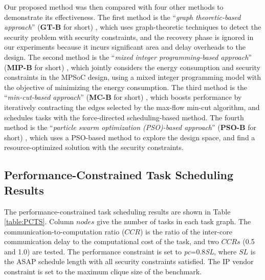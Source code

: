 \documentclass[10pt,journal, compsoc]{IEEEtran}
\begin{document}
Our proposed method was then compared with four other methods to demonstrate its effectiveness. The first method is the ``\textit{graph theoretic-based approach}'' (\textbf{GT-B} for short) \cite{article:XC}, which uses graph-theoretic techniques to detect the security problem with security constraints, and the recovery phase is ignored in our experiments because it incurs significant area and delay overheads to the design. The second method is the ``\textit{mixed integer programming-based approach}'' (\textbf{MIP-B} for short) \cite{article:YS}, which jointly considers the energy consumption and security constraints in the MPSoC design, using a mixed integer programming model with the objective of minimizing the energy consumption. The third method is the ``\textit{min-cut-based approach}'' (\textbf{MC-B} for short) \cite{article:NW}, which boosts performance by iteratively contracting the edges selected by the max-flow min-cut algorithm, and schedules tasks with the force-directed scheduling-based method. The fourth method is the ``\textit{particle swarm optimization (PSO)-based approach}'' (\textbf{PSO-B} for short) \cite{article:SR}, which uses a PSO-based method to explore the design space, and find a resource-optimized solution with the security constraints.





\subsection{Performance-Constrained Task Scheduling Results}


The performance-constrained task scheduling results are shown in Table \ref{table:PCTS}. Column $nodes$ give the number of tasks in each task graph. The communication-to-computation ratio ($CCR$) is the ratio of the inter-core communication delay to the computational cost of the task, and two $CCRs$ (0.5 and 1.0) are tested. The performance constraint is set to \textit{pc}=0.8\textit{SL}, where $SL$ is the ASAP schedule length with all security constraints satisfied. The IP vendor constraint is set to the maximum clique size of the benchmark.
\end{document}
